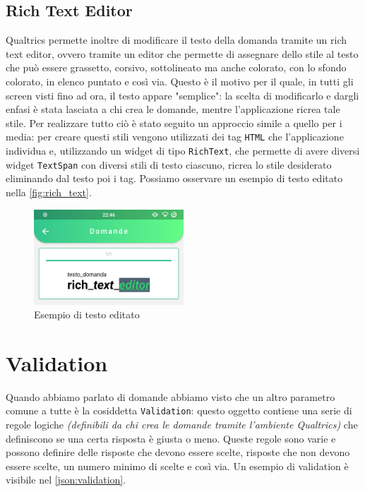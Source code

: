 \subsection{Rich Text Editor}
Qualtrics permette inoltre di modificare il testo della domanda tramite un rich text editor, ovvero tramite un editor che permette di assegnare dello stile al testo che può essere grassetto, corsivo, sottolineato ma anche colorato, con lo sfondo colorato, in elenco puntato e così via. Questo è il motivo per il quale, in tutti gli screen visti fino ad ora, il testo appare "semplice": la scelta di modificarlo e dargli enfasi è stata lasciata a chi crea le domande, mentre l'applicazione ricrea tale stile.
Per realizzare tutto ciò è stato seguito un approccio simile a quello per i media: per creare questi stili vengono utilizzati dei tag \texttt{HTML} che l'applicazione individua e, utilizzando un widget di tipo \texttt{RichText}, che permette di avere diversi widget \texttt{TextSpan} con diversi stili di testo ciascuno, ricrea lo stile desiderato eliminando dal testo poi i tag. Possiamo osservare un esempio di testo editato nella \autoref{fig:rich_text}.

\begin{figure}[h!]
\centering
\includegraphics[width=0.5\textwidth]{img/rich_text}
\caption{Esempio di testo editato}
\label{fig:rich_text}
\end{figure}

\section{Validation}
Quando abbiamo parlato di domande abbiamo visto che un altro parametro comune a tutte è la cosiddetta \texttt{Validation}: questo oggetto contiene una serie di regole logiche \textit{(definibili da chi crea le domande tramite l'ambiente Qualtrics)} che definiscono se una certa risposta è giusta o meno. Queste regole sono varie e possono definire delle risposte che devono essere scelte, risposte che non devono essere scelte, un numero minimo di scelte e così via. Un esempio di validation è visibile nel \autoref{json:validation}.

